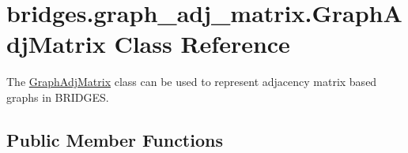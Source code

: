 \hypertarget{classbridges_1_1graph__adj__matrix_1_1_graph_adj_matrix}{}\section{bridges.\+graph\+\_\+adj\+\_\+matrix.\+Graph\+Adj\+Matrix Class Reference}
\label{classbridges_1_1graph__adj__matrix_1_1_graph_adj_matrix}


The \hyperlink{classbridges_1_1graph__adj__matrix_1_1_graph_adj_matrix}{Graph\+Adj\+Matrix} class can be used to represent adjacency matrix based graphs in B\+R\+I\+D\+G\+E\+S.  


\subsection*{Public Member Functions}
